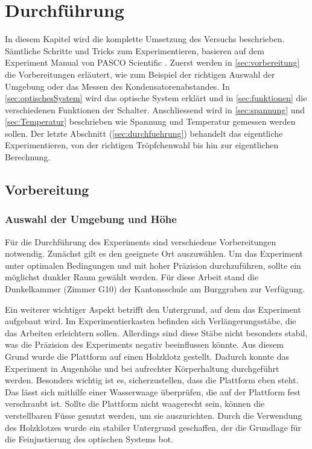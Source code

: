 \chapter{Durchführung}\label{cha:durchfuehrung}
In diesem Kapitel wird die komplette Umsetzung des Versuchs beschrieben. Sämtliche Schritte und Tricks zum Experimentieren, basieren auf dem Experiment Manual von PASCO Scientific \parencite{instructionManualHalogen}. Zuerst werden in \autoref{sec:vorbereitung} die Vorbereitungen erläutert, wie zum Beispiel der richtigen Auswahl der Umgebung oder das Messen des Kondensatorenabstandes. In \autoref{sec:optischesSystem} wird das optische System erklärt und in \autoref{sec:funktionen} die verschiedenen Funktionen der Schalter. Anschliessend wird in \autoref{sec:spannung} und \autoref{sec:Temperatur} beschrieben wie Spannung und Temperatur gemessen werden sollen. Der letzte Abschnitt (\autoref{sec:durchfuehrung}) behandelt das eigentliche Experimentieren, von der richtigen Tröpfchenwahl bis hin zur eigentlichen Berechnung.

\section{Vorbereitung}\label{sec:vorbereitung}
\subsection{Auswahl der Umgebung und Höhe}\label{sub:auswahlUmgebung}
Für die Durchführung des Experiments sind verschiedene Vorbereitungen notwendig. Zunächst gilt es den geeignete Ort auszuwählen. Um das Experiment unter optimalen Bedingungen und mit hoher Präzision durchzuführen, sollte ein möglichst dunkler Raum gewählt werden. Für diese Arbeit stand die Dunkelkammer (Zimmer G10) der Kantonsschule am Burggraben zur Verfügung.

Ein weiterer wichtiger Aspekt betrifft den Untergrund, auf dem das Experiment aufgebaut wird. Im Experimentierkasten befinden sich Verlängerungsstäbe, die das Arbeiten erleichtern sollen. Allerdings sind diese Stäbe nicht besonders stabil, was die Präzision des Experiments negativ beeinflussen könnte. Aus diesem Grund wurde die Plattform auf einen Holzklotz gestellt. Dadurch konnte das Experiment in Augenhöhe und bei aufrechter Körperhaltung durchgeführt werden. Besonders wichtig ist es, sicherzustellen, dass die Plattform eben steht. Das lässt sich mithilfe einer Wasserwaage überprüfen, die auf der Plattform fest verschraubt ist. Sollte die Plattform nicht waagerecht sein, können die verstellbaren Füsse genutzt werden, um sie auszurichten. Durch die Verwendung des Holzklotzes wurde ein stabiler Untergrund geschaffen, der die Grundlage für die Feinjustierung des optischen Systems bot.

